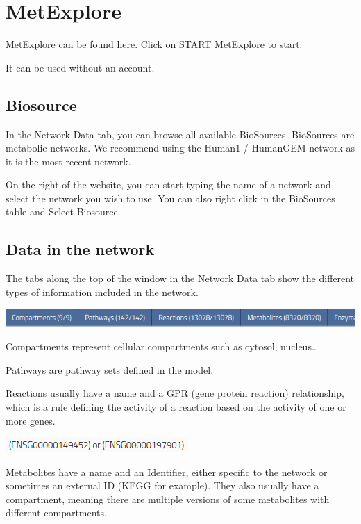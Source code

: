 \documentclass[
  24px,
  letterpaper,
  DIV=11,
  numbers=noendperiod]{scrartcl}
\begin{document}
\hypertarget{metexplore}{%
\section{MetExplore}\label{metexplore}}

MetExplore can be found
\href{https://metexplore.toulouse.inrae.fr/index.html/}{here}. Click on
START MetExplore to start.

It can be used without an account.

\hypertarget{biosource}{%
\subsection{Biosource}\label{biosource}}

In the Network Data tab, you can browse all available BioSources.
BioSources are metabolic networks. We recommend using the Human1 /
HumanGEM network as it is the most recent network.

On the right of the website, you can start typing the name of a network
and select the network you wish to use. You can also right click in the
BioSources table and Select Biosource.

\hypertarget{data-in-the-network}{%
\subsection{Data in the network}\label{data-in-the-network}}

The tabs along the top of the window in the Network Data tab show the
different types of information included in the network.

\includegraphics{images/metexplore_network_data.png}

Compartments represent cellular compartments such as cytosol,
nucleus\ldots{}

Pathways are pathway sets defined in the model.

Reactions usually have a name and a GPR (gene protein reaction)
relationship, which is a rule defining the activity of a reaction based
on the activity of one or more genes.

\includegraphics{images/metexplore_GPR.png}

Metabolites have a name and an Identifier, either specific to the
network or sometimes an external ID (KEGG for example). They also
usually have a compartment, meaning there are multiple versions of some
metabolites with different compartments.
\end{document}
